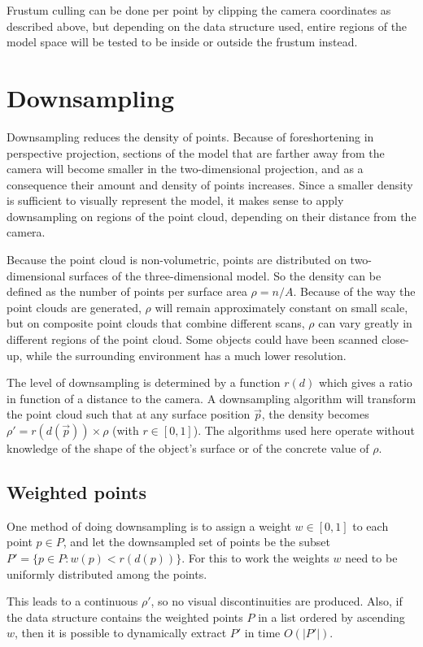 \documentclass[a4paper,10pt,abstracton,notitlepage]{scrreprt}
\begin{document}
Frustum culling can be done per point by clipping the camera coordinates as described above, but depending on the data structure used, entire regions of the model space will be tested to be inside or outside the frustum instead.


\section{Downsampling}
Downsampling reduces the density of points. Because of foreshortening in perspective projection, sections of the model that are farther away from the camera will become smaller in the two-dimensional projection, and as a consequence their amount and density of points increases. Since a smaller density is sufficient to visually represent the model, it makes sense to apply downsampling on regions of the point cloud, depending on their distance from the camera.

Because the point cloud is non-volumetric, points are distributed on two-dimensional surfaces of the three-dimensional model. So the density can be defined as the number of points per surface area $\rho = n/A$. Because of the way the point clouds are generated, $\rho$ will remain approximately constant on small scale, but on composite point clouds that combine different scans, $\rho$ can vary greatly in different regions of the point cloud. Some objects could have been scanned close-up, while the surrounding environment has a much lower resolution. 

The level of downsampling is determined by a function $r(d)$ which gives a ratio in function of a distance to the camera. A downsampling algorithm will transform the point cloud such that at any surface position $\overrightarrow{p}$, the density becomes $\rho' = r(d(\overrightarrow{p})) \times \rho$ (with $r \in [0, 1]$). The algorithms used here operate without knowledge of the shape of the object's surface or of the concrete value of $\rho$.

\subsection{Weighted points}
One method of doing downsampling is to assign a weight $w \in [0, 1]$ to each point $p \in P$, and let the downsampled set of points be the subset $P' = \{ p \in P : w(p) < r(d(p)) \}$. For this to work the weights $w$ need to be uniformly distributed among the points.

This leads to a continuous $\rho'$, so no visual discontinuities are produced. Also, if the data structure contains the weighted points $P$ in a list ordered by ascending $w$, then it is possible to dynamically extract $P'$ in time $O(|P'|)$.
\end{document}
